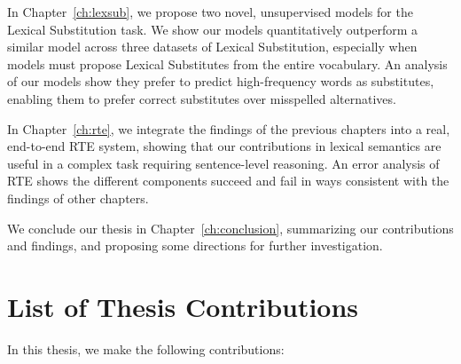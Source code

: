 In Chapter~\ref{ch:lexsub}, we propose two novel, unsupervised models for
the Lexical Substitution task. We show our models quantitatively outperform
a similar model across three datasets of Lexical Substitution, especially
when models must propose Lexical Substitutes from the entire vocabulary.
An analysis of our models show they prefer to predict high-frequency words
as substitutes, enabling them to prefer correct substitutes over
misspelled alternatives.

In Chapter~\ref{ch:rte}, we integrate the findings of the previous chapters
into a real, end-to-end RTE system, showing that our contributions in lexical
semantics are useful in a complex task requiring sentence-level reasoning.
An error analysis of RTE shows the different components succeed and fail
in ways consistent with the findings of other chapters.

We conclude our thesis in Chapter~\ref{ch:conclusion}, summarizing our
contributions and findings, and proposing some directions for further
investigation.


\section{List of Thesis Contributions}

\noindent In this thesis, we make the following contributions:

